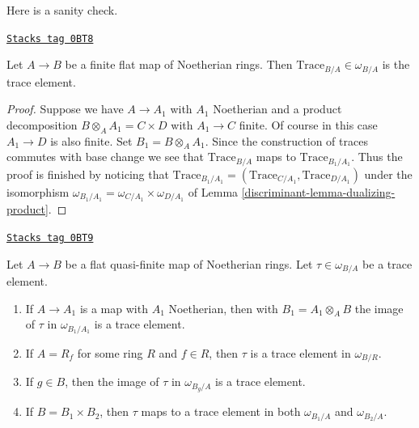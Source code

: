 Here is a sanity check.

\begin{lemma}
\label{discriminant-lemma-finite-flat-trace}
\href{https://stacks.math.columbia.edu/tag/0BT8}{\texttt{Stacks tag 0BT8}}

Let $A \to B$ be a finite flat map of Noetherian rings.
Then $\text{Trace}_{B/A} \in \omega_{B/A}$ is the trace element.
\end{lemma}

\begin{proof}

Suppose we have $A \to A_1$ with $A_1$ Noetherian and
a product decomposition $B \otimes_A A_1 = C \times D$ with $A_1 \to C$
finite. Of course in this case $A_1 \to D$ is also finite.
Set $B_1 = B \otimes_A A_1$.
Since the construction of traces commutes with base change
we see that $\text{Trace}_{B/A}$ maps to $\text{Trace}_{B_1/A_1}$.
Thus the proof is finished by noticing that
$\text{Trace}_{B_1/A_1} = (\text{Trace}_{C/A_1}, \text{Trace}_{D/A_1})$
under the isomorphism
$\omega_{B_1/A_1} = \omega_{C/A_1} \times \omega_{D/A_1}$
of Lemma \ref{discriminant-lemma-dualizing-product}.
\end{proof}

\begin{lemma}
\label{discriminant-lemma-trace-base-change}
\href{https://stacks.math.columbia.edu/tag/0BT9}{\texttt{Stacks tag 0BT9}}

Let $A \to B$ be a flat quasi-finite map of Noetherian rings.
Let $\tau \in \omega_{B/A}$ be a trace element.
\begin{enumerate}
\item If $A \to A_1$ is a map with $A_1$ Noetherian, then with
$B_1 = A_1 \otimes_A B$ the image of $\tau$ in $\omega_{B_1/A_1}$ is a
trace element.
\item If $A = R_f$ for some ring $R$ and $f \in R$, then
$\tau$ is a trace element in $\omega_{B/R}$.
\item If $g \in B$, then the image of $\tau$ in $\omega_{B_g/A}$
is a trace element.
\item If $B = B_1 \times B_2$, then $\tau$ maps to a trace element
in both $\omega_{B_1/A}$ and $\omega_{B_2/A}$.
\end{enumerate}
\end{lemma}

